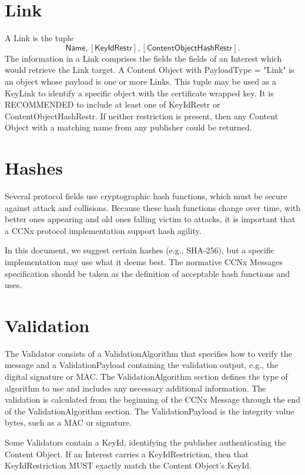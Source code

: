 \documentclass[12pt]{article}
\begin{document}
\section{Link}
A Link is the tuple
$$
{\mathsf{Name}, [\mathsf{KeyIdRestr}], [\mathsf{ContentObjectHashRestr}]}.
$$
The information in a Link comprises the fields the fields of an
Interest which would retrieve the Link target.  A Content Object with
PayloadType = "Link" is an object whose payload is one or more Links.
This tuple may be used as a KeyLink to identify a specific object
with the certificate wrapped key.  It is RECOMMENDED to include at
least one of KeyIdRestr or ContentObjectHashRestr.  If neither
restriction is present, then any Content Object with a matching name
from any publisher could be returned.

\section{Hashes}
Several protocol fields use cryptographic hash functions, which must
be secure against attack and collisions.  Because these hash
functions change over time, with better ones appearing and old ones
falling victim to attacks, it is important that a CCNx protocol
implementation support hash agility.

In this document, we suggest certain hashes (e.g., SHA-256), but a
specific implementation may use what it deems best.  The normative
CCNx Messages \cite{messages} specification should be taken as the
definition of acceptable hash functions and uses.

\section{Validation}
The Validator consists of a ValidationAlgorithm that specifies how to
verify the message and a ValidationPayload containing the validation
output, e.g., the digital signature or MAC.  The ValidationAlgorithm
section defines the type of algorithm to use and includes any
necessary additional information.  The validation is calculated from
the beginning of the CCNx Message through the end of the
ValidationAlgorithm section.  The ValidationPayload is the integrity
value bytes, such as a MAC or signature.

Some Validators contain a KeyId, identifying the publisher
authenticating the Content Object.  If an Interest carries a
KeyIdRestriction, then that KeyIdRestriction MUST exactly match the
Content Object's KeyId.
\end{document}
